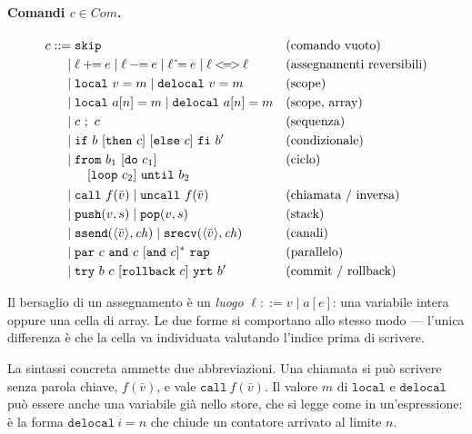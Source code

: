 \paragraph{Comandi $c \in \mathit{Com}$.}
\begin{align*}
c ::={}& \mathtt{skip} && \text{(comando vuoto)}\\
   \mid{}& \ell \mathbin{+\!\!=} e \mid \ell \mathbin{-\!\!=} e \mid \ell \mathbin{\hat{}\!=} e \mid \ell \mathbin{<\!=\!>} \ell && \text{(assegnamenti reversibili)}\\
   \mid{}& \mathtt{local}\ v = m \mid \mathtt{delocal}\ v = m && \text{(scope)}\\
   \mid{}& \mathtt{local}\ a[n] = m \mid \mathtt{delocal}\ a[n] = m && \text{(scope, array)}\\
   \mid{}& c\ ;\ c && \text{(sequenza)}\\
   \mid{}& \mathtt{if}\ b\ [\mathtt{then}\ c]\ [\mathtt{else}\ c]\ \mathtt{fi}\ b' && \text{(condizionale)}\\
   \mid{}& \begin{array}[t]{@{}l@{}}\mathtt{from}\ b_1\ [\mathtt{do}\ c_1]\\ \quad[\mathtt{loop}\ c_2]\ \mathtt{until}\ b_2\end{array} && \text{(ciclo)}\\
   \mid{}& \mathtt{call}\ f(\bar v) \mid \mathtt{uncall}\ f(\bar v) && \text{(chiamata / inversa)}\\
   \mid{}& \mathtt{push}(v,s) \mid \mathtt{pop}(v,s) && \text{(stack)}\\
   \mid{}& \mathtt{ssend}(\langle \bar v \rangle, \mathit{ch}) \mid \mathtt{srecv}(\langle \bar v \rangle, \mathit{ch}) && \text{(canali)}\\
   \mid{}& \mathtt{par}\ c\ \mathtt{and}\ c\ [\mathtt{and}\ c]^{*}\ \mathtt{rap} && \text{(parallelo)}\\
   \mid{}& \mathtt{try}\ b\ c\ [\mathtt{rollback}\ c]\ \mathtt{yrt}\ b' && \text{(commit / rollback)}
\end{align*}

\noindent
Il bersaglio di un assegnamento è un \emph{luogo} $\ell ::= v \mid a[e]$: una
variabile intera oppure una cella di array. Le due forme si comportano allo
stesso modo — l'unica differenza è che la cella va individuata valutando
l'indice prima di scrivere.

\noindent
La sintassi concreta ammette due abbreviazioni. Una chiamata si può scrivere
senza parola chiave, $f(\bar v)$, e vale $\mathtt{call}\ f(\bar v)$. Il valore
$m$ di $\mathtt{local}$ e $\mathtt{delocal}$ può essere anche una variabile già
nello store, che si legge come in un'espressione: è la forma
$\mathtt{delocal}\ i = n$ che chiude un contatore arrivato al limite $n$.

